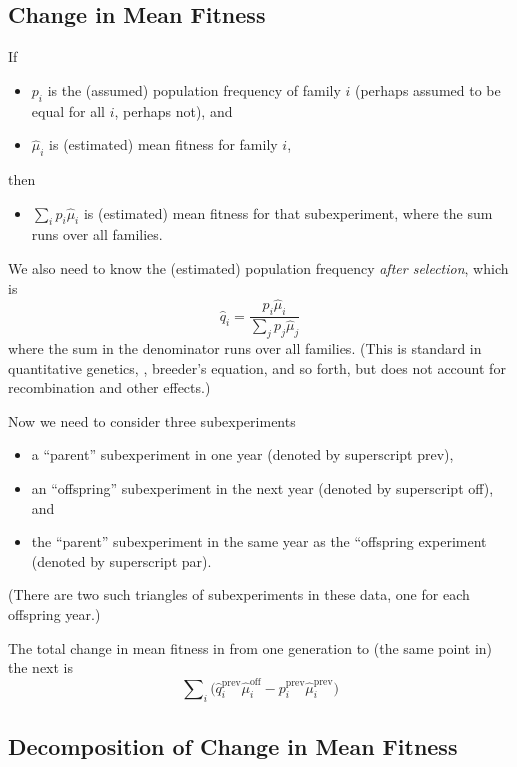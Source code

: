 \documentclass[11pt]{article}
\begin{document}
\subsection{Change in Mean Fitness}

If
\begin{itemize}
\item $p_i$ is the (assumed) population frequency of family $i$
    (perhaps assumed to be equal for all $i$, perhaps not), and
\item $\hat{\mu}_i$ is (estimated) mean fitness for family $i$,
\end{itemize}
then
\begin{itemize}
\item $\sum_i p_i \hat{\mu}_i$ is (estimated) mean fitness for
that subexperiment, where the sum runs over all families.
\end{itemize}

We also need to know the (estimated) population frequency
\emph{after selection}, which is
\begin{equation*}
   \hat{q}_i = \frac{p_i \hat{\mu}_i}{\sum_j p_j \hat{\mu}_j}
\end{equation*}
where the sum in the denominator runs over all families.
(This is standard in quantitative genetics, \citet{lande-arnold},
breeder's equation,
and so forth, but does not account for recombination and other effects.)

Now we need to consider three subexperiments
\begin{itemize}
\item a ``parent'' subexperiment in one year (denoted by superscript prev),
\item an ``offspring'' subexperiment in the next year (denoted
    by superscript off), and
\item the ``parent'' subexperiment in the same year as the ``offspring
    experiment (denoted by superscript par).
\end{itemize}
(There are two such triangles of subexperiments in these data, one
for each offspring year.)

The total change in mean fitness in from one generation to (the same point in) the next is
\begin{equation} \label{eq:total-change}
   \sum\nolimits_i \bigl(
   \hat{q}_i^\text{prev} \hat{\mu}_i^\text{off}
   -
   p_i^\text{prev} \hat{\mu}_i^\text{prev}
   \bigr)
\end{equation}

\subsection{Decomposition of Change in Mean Fitness}
\end{document}
